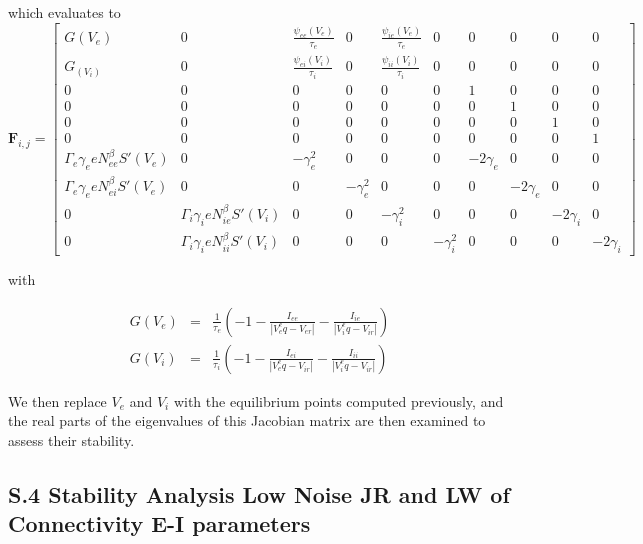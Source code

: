 \documentclass[12pt,twoside]{article}
\begin{document}
which evaluates to 
\[
\mathbf{F}_{i,j} =
\begin{bmatrix}
 G(V_e)  & 
    0 & 
    \frac{\psi_{ee}(V_e)}{\tau_e} &
    0 &
    \frac{\psi_{ie}(V_e)}{\tau_e} &
    0 &
    0 &
    0 &
    0 &
    0 \\[1ex] %
  G_(V_i) & 
    0 & 
    \frac{\psi_{ei}(V_i)}{\tau_i} &
    0 &
    \frac{\psi_{ii}(V_i)}{\tau_i} &
    0 &
    0 &
    0 &
    0 &
    0 \\[1ex]
  0 & 
    0 & 
    0 &
    0 &
    0 &
    0 &
    1 &
    0 &
    0 &
    0\\[1ex]
  0 & 
    0 & 
    0 &
    0 &
    0 &
    0 &
    0 &
    1 &
    0 &
    0\\[1ex]
  0 & 
    0 & 
    0 &
    0 &
    0 &
    0 &
    0 &
    0 &
    1 &
    0\\[1ex]
  0 & 
    0 & 
    0 &
    0 &
    0 &
    0 &
    0 &
    0 &
    0 &
    1\\[1ex]
  \Gamma_e\gamma_{e}eN_{ee}^{\beta}S'(V_e)& 
    0 & 
    -\gamma_{e}^2 &
    0 &
    0 &
    0 &
    -2\gamma_e &
    0 &
    0 &
    0\\[1ex]
  \Gamma_e\gamma_{e}eN_{ei}^{\beta}S'(V_e)& 
    0 & 
    0 &
    -\gamma_{e}^2 &
    0 &
    0 &
    0 &
    -2\gamma_e &
    0 &
    0\\[1ex]
  0 & 
    \Gamma_i\gamma_{i}eN_{ie}^{\beta}S'(V_i) & 
    0 &
    0 &
    -\gamma_{i}^2 &
    0 &
    0 &
    0 &
    -2\gamma_i &
    0\\[1ex]
  0 & 
    \Gamma_i\gamma_{i}eN_{ii}^{\beta}S'(V_i) & 
    0 &
    0 &
    0 &
    -\gamma_{i}^2 &
    0 &
    0 &
    0 &
    -2\gamma_i
\end{bmatrix}
\]

with 

\begin{eqnarray}
    G(V_e) &=&  \frac{1}{\tau_e}(-1 - \frac{I_{ee}}{|V_e^eq - V_{er}|} - \frac{I_{ie}}{|V_i^eq - V_{ir}|}) \\
    G(V_i) &=& \frac{1}{\tau_i}(-1 - \frac{I_{ei}}{|V_e^eq - V_{ir}|} - \frac{I_{ii}}{|V_i^eq - V_{ir}|})
\end{eqnarray}

We then replace $V_e$ and $V_i$ with the equilibrium points computed previously, and the real parts of the eigenvalues of this Jacobian matrix are then examined to assess their stability. 

\newpage
\subsection*{S.4 Stability Analysis Low Noise JR and LW of Connectivity E-I parameters}
\end{document}
